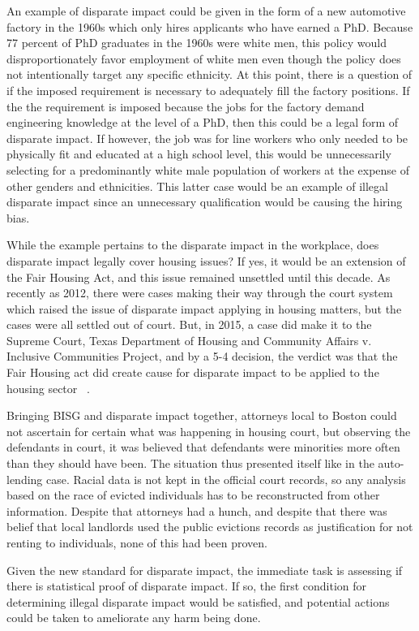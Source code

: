 \par An example of disparate impact could be given in the form of a new automotive factory in the 1960s which only hires applicants who have earned a PhD.  Because 77 percent of PhD graduates in the 1960s were white men, this policy would disproportionately favor employment of white men even though the policy does not intentionally target any specific ethnicity.  At this point, there is a question of if the imposed requirement is necessary to adequately fill the factory positions.  If the the requirement is imposed because the jobs for the factory demand engineering knowledge at the level of a PhD, then this could be a legal form of disparate impact.  If however, the job was for line workers who only needed to be physically fit and educated at a high school level, this would be unnecessarily selecting for a predominantly white male population of workers at the expense of other genders and ethnicities.  This latter case would be an example of illegal disparate impact since an unnecessary qualification would be causing the hiring bias.

\par While the example pertains to the disparate impact in the workplace, does disparate impact legally cover housing issues?  If yes, it would be an extension of the Fair Housing Act,  and this issue remained unsettled until this decade.  As recently as 2012, there were cases making their way through the court system which raised the issue of disparate impact applying in housing matters, but the cases were all settled out of court.  But, in 2015, a case did make it to the Supreme Court, Texas Department of Housing and Community Affairs v. Inclusive Communities Project, and by a 5-4 decision, the verdict was that the Fair Housing act did create cause for disparate impact to be applied to the housing sector ~\citep{WEBSITE:7}.

\par Bringing BISG and disparate impact together, attorneys local to Boston could not ascertain for certain what was happening in housing court, but observing the defendants in court, it was believed that defendants were minorities more often than they should have been.  The situation thus presented itself like in the auto-lending case.  Racial data is not kept in the official court records, so any analysis based on the race of evicted individuals has to be reconstructed from other information.  Despite that attorneys had a hunch, and despite that there was belief that local landlords used the public evictions records as justification for not renting to individuals, none of this had been proven.

\par Given the new standard for disparate impact, the immediate task is assessing if there is statistical proof of disparate impact.  If so, the first condition for determining illegal disparate impact would be satisfied, and potential actions could be taken to ameliorate any harm being done.